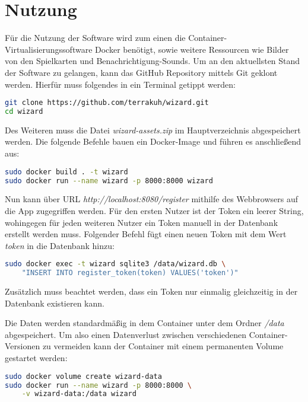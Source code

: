 \chapter{Nutzung}
Für die Nutzung der Software wird zum einen die Container-Virtualisierungssoftware Docker benötigt, sowie weitere Ressourcen wie Bilder von den Spielkarten und Benachrichtigung-Sounds. Um an den aktuellsten Stand der Software zu gelangen, kann das GitHub Repository mittels Git geklont werden. Hierfür muss folgendes in ein Terminal getippt werden:

\begin{lstlisting}[language=bash]
git clone https://github.com/terrakuh/wizard.git
cd wizard
\end{lstlisting}

Des Weiteren muss die Datei \textit{wizard-assets.zip} im Hauptverzeichnis abgespeichert werden. Die folgende Befehle bauen ein Docker-Image und führen es anschließend aus:

\begin{lstlisting}[language=bash]
sudo docker build . -t wizard
sudo docker run --name wizard -p 8000:8000 wizard
\end{lstlisting}

Nun kann über URL \textit{http://localhost:8080/register} mithilfe des Webbrowsers auf die App zugegriffen werden. Für den ersten Nutzer ist der Token ein leerer String, wohingegen für jeden weiteren Nutzer ein Token manuell in der Datenbank erstellt werden muss. Folgender Befehl fügt einen neuen Token mit dem Wert \textit{token} in die Datenbank hinzu:

\begin{lstlisting}[language=bash]
sudo docker exec -t wizard sqlite3 /data/wizard.db \
	"INSERT INTO register_token(token) VALUES('token')"
\end{lstlisting}

Zusätzlich muss beachtet werden, dass ein Token nur einmalig gleichzeitig in der Datenbank existieren kann.

Die Daten werden standardmäßig in dem Container unter dem Ordner \textit{/data} abgespeichert. Um also einen Datenverlust zwischen verschiedenen Container-Versionen zu vermeiden kann der Container mit einem permanenten Volume gestartet werden:

\begin{lstlisting}[language=bash]
sudo docker volume create wizard-data
sudo docker run --name wizard -p 8000:8000 \
	-v wizard-data:/data wizard
\end{lstlisting}

